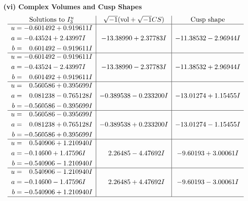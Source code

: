 \documentclass[1p]{elsarticle_modified}
\theoremstyle{definition}
\newcommand{\I}{\sqrt{-1}}
\begin{document}
\newpage\flushleft \textbf{(vi) Complex Volumes and Cusp Shapes}
$$\begin{array}{c|c|c}  
\text{Solutions to }I^u_{3}& \I (\text{vol} + \sqrt{-1}CS) & \text{Cusp shape}\\
 \hline 
\begin{aligned}
u &= -0.601492 + 0.919611 I \\
a &= -0.43524 + 2.43997 I \\
b &= \phantom{-}0.601492 - 0.919611 I\end{aligned}
 & -13.38990 + 2.37783 I & -11.38532 - 2.96944 I \\ \hline\begin{aligned}
u &= -0.601492 - 0.919611 I \\
a &= -0.43524 - 2.43997 I \\
b &= \phantom{-}0.601492 + 0.919611 I\end{aligned}
 & -13.38990 - 2.37783 I & -11.38532 + 2.96944 I \\ \hline\begin{aligned}
u &= \phantom{-}0.560586 + 0.395699 I \\
a &= \phantom{-}0.081238 - 0.765128 I \\
b &= -0.560586 - 0.395699 I\end{aligned}
 & -0.389538 - 0.233200 I & -13.01274 + 1.15455 I \\ \hline\begin{aligned}
u &= \phantom{-}0.560586 - 0.395699 I \\
a &= \phantom{-}0.081238 + 0.765128 I \\
b &= -0.560586 + 0.395699 I\end{aligned}
 & -0.389538 + 0.233200 I & -13.01274 - 1.15455 I \\ \hline\begin{aligned}
u &= \phantom{-}0.540906 + 1.210940 I \\
a &= -0.14600 + 1.47596 I \\
b &= -0.540906 - 1.210940 I\end{aligned}
 & \phantom{-}2.26485 - 4.47692 I & -9.60193 + 3.00061 I \\ \hline\begin{aligned}
u &= \phantom{-}0.540906 - 1.210940 I \\
a &= -0.14600 - 1.47596 I \\
b &= -0.540906 + 1.210940 I\end{aligned}
 & \phantom{-}2.26485 + 4.47692 I & -9.60193 - 3.00061 I\\
 \hline 
 \end{array}$$\newpage\newpage\renewcommand{\arraystretch}{1}
\end{document}
